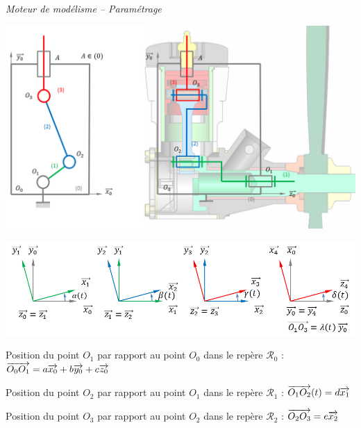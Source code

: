 \documentclass[10pt,oneside]{article}
\begin{document}
\begin{exemple}
\textit{Moteur de modélisme -- Paramétrage}

\begin{center}
\includegraphics[width=.75\textwidth]{png/moteur_2d_sch}
\end{center}
\begin{center}
\includegraphics[width=.85\textwidth]{png/param}
\end{center}

Position du point $O_1$ par rapport au point $O_0$ dans le repère $\mathcal{R}_0$ : 
$ \overrightarrow{O_0 O_1}= a\overrightarrow{x_0}+b\overrightarrow{y_0}+c\overrightarrow{z_0} $

Position du point $O_2$ par rapport au point $O_1$ dans le repère $\mathcal{R}_1$ : 
$ \overrightarrow{O_1 O_2}(t)= d\overrightarrow{x_1} $


Position du point $O_3$ par rapport au point $O_2$ dans le repère $\mathcal{R}_2$ : 
$ \overrightarrow{O_2 O_3}= e\overrightarrow{x_2} $




\end{exemple}
\end{document}
